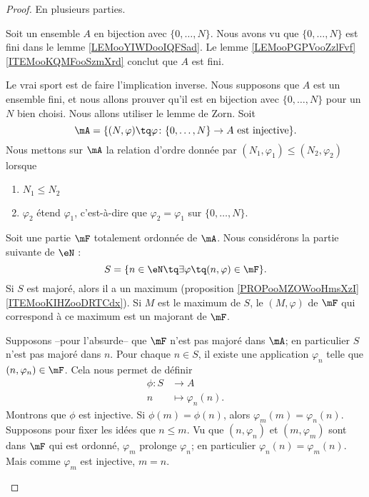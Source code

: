 \begin{proof}
	En plusieurs parties.
	\begin{subproof}
		\spitem[\ref{ITEMooMNMTooEOIjdo}\( \Leftarrow\)]

		Soit un ensemble \( A\) en bijection avec \( \{ 0,\ldots, N \}\). Nous avons vu que \( \{ 0,\ldots, N \}\) est fini dans le lemme \ref{LEMooYIWDooIQFSad}. Le lemme \ref{LEMooPGPVooZzlFvf}\ref{ITEMooKQMFooSzmXrd} conclut que \( A\) est fini.

		\spitem[\ref{ITEMooMNMTooEOIjdo}\( \Rightarrow\)]
		Le vrai sport est de faire l'implication inverse. Nous supposons que \( A\) est un ensemble fini, et nous allons prouver qu'il est en bijection avec \( \{ 0,\ldots, N \}\) pour un \( N\) bien choisi. Nous allons utiliser le lemme de Zorn. Soit
		\begin{equation}
			\mA=\{ (N,\varphi)\tq  \varphi\colon \{ 0,\ldots, N \}\to A\text{ est injective} \}.
		\end{equation}
		Nous mettons sur \( \mA\) la relation d'ordre donnée par \( (N_1,\varphi_1)\leq (N_2,\varphi_2)\) lorsque
		\begin{enumerate}
			\item
			      \( N_1\leq N_2\)
			\item
			      \( \varphi_2\) étend \( \varphi_1\), c'est-à-dire que \( \varphi_2=\varphi_1\) sur \( \{ 0,\ldots, N \}\).
		\end{enumerate}
		\begin{subproof}
			Soit une partie \( \mF\) totalement ordonnée de \( \mA\). Nous considérons la partie suivante de \( \eN\) :
			\begin{equation}
				S=\{ n\in \eN\tq \exists  \varphi \tq (n,\varphi)\in \mF \}.
			\end{equation}
			Si \( S\) est majoré, alors il a un maximum (proposition \ref{PROPooMZOWooHmsXzI}\ref{ITEMooKIHZooDRTCdx}). Si \( M\) est le maximum de \( S\), le \( (M,\varphi)\) de \( \mF\) qui correspond à ce maximum est un majorant de \( \mF\).

			Supposons --pour l'absurde-- que \( \mF\) n'est pas majoré dans \( \mA\); en particulier \( S\) n'est pas majoré dans \( n\). Pour chaque \( n\in S\), il existe une application \( \varphi_n\) telle que \( (n,\varphi_n)\in\mF\). Cela nous permet de définir
			\begin{equation}
				\begin{aligned}
					\phi\colon S & \to A                 \\
					n            & \mapsto \varphi_n(n).
				\end{aligned}
			\end{equation}
			Montrons que \( \phi\) est injective. Si \( \phi(m)=\phi(n)\), alors \( \varphi_m(m)=\varphi_n(n)\). Supposons pour fixer les idées que \( n\leq m\). Vu que \( (n,\varphi_n)\) et \( (m,\varphi_m)\) sont dans \( \mF\) qui est ordonné, \( \varphi_m\) prolonge \( \varphi_n\); en particulier \( \varphi_n(n)=\varphi_m(n)\). Mais comme \( \varphi_m\) est injective, \( m=n\).


\end{subproof}
\end{subproof}
\end{proof}
